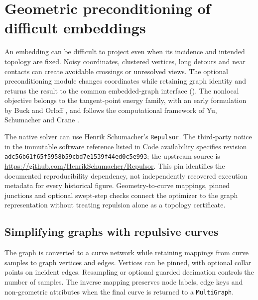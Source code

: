 
\section{Geometric preconditioning of difficult embeddings}
\label{supp:repulsive_layout}
An embedding can be difficult to project even when its incidence and intended topology are fixed. Noisy coordinates, clustered vertices, long detours and near contacts can create avoidable crossings or unresolved views. The optional preconditioning module changes coordinates while retaining graph identity and returns the result to the common embedded-graph interface (). The nonlocal objective belongs to the tangent-point energy family, with an early formulation by Buck and Orloff \cite{kg_buck1995energy}, and follows the computational framework of Yu, Schumacher and Crane \cite{kg_yu2021repulsive}.

The native solver can use Henrik Schumacher's \texttt{Repulsor}. The third-party notice in the immutable software reference listed in Code availability specifies revision \texttt{adc56b61f65f5958b59cbd7e1539f44ed0c5e993}; the upstream source is \url{https://github.com/HenrikSchumacher/Repulsor}. This pin identifies the documented reproducibility dependency, not independently recovered execution metadata for every historical figure. Geometry-to-curve mappings, pinned junctions and optional swept-step checks connect the optimizer to the graph representation without treating repulsion alone as a topology certificate.

\subsection{Simplifying graphs with repulsive curves}
\label{supp:repulsive_objective}
The graph is converted to a curve network while retaining mappings from curve samples to graph vertices and edges. Vertices can be pinned, with optional collar points on incident edges. Resampling or optional guarded decimation controls the number of samples. The inverse mapping preserves node labels, edge keys and non-geometric attributes when the final curve is returned to a \texttt{MultiGraph}.

